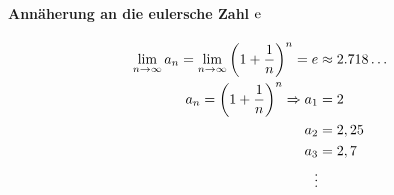 \paragraph{Annäherung an die eulersche Zahl \( \mathop{}\!\mathrm{e} \)}
\begin{align}
    \begin{split}
        \label{eq:euler}
        \lim_{n \rightarrow \infty} a_n = \lim_{n \rightarrow \infty} {\left( 1 + \frac{1}{n} \right)}^n = e &\approx 2.718\dots \\
        a_n = {\left( 1 + \frac{1}{n} \right)}^n
        \Rightarrow a_1 &= 2 \\
        a_2 &= 2,25 \\
        a_3 &= 2,7 \\
        \vdots
    \end{split}
\end{align}
